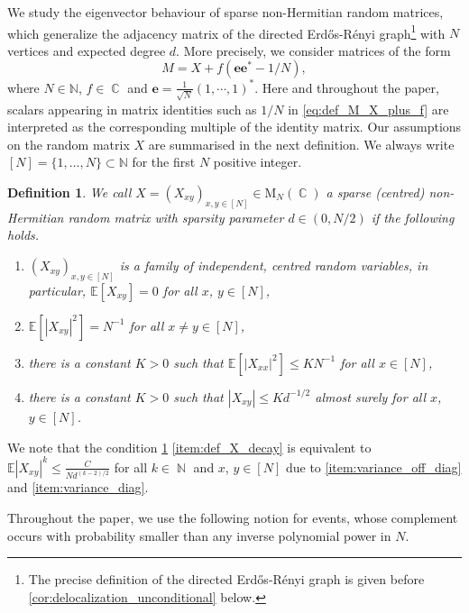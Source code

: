 \documentclass[10pt,a4paper]{amsart}
\DeclareMathOperator{\CC}{\mathbb{C}}
\DeclareMathOperator{\NN}{\mathbb{N}}
\newcommand{\abs}[1]{\left| #1 \right|}
\newcommand{\N}{\mathbb{N}}
\newcommand{\E}{\mathbb{E}}
\newtheorem{defi}{Definition}[section]
\numberwithin{equation}{section}
\begin{document}
	We study the eigenvector behaviour of sparse non-Hermitian random matrices, which generalize 
	the adjacency matrix of the directed Erd\H{o}s-R{\'e}nyi graph\footnote{The precise definition of the directed Erd\H{o}s-R{\'e}nyi graph is given before \cref{cor:delocalization_unconditional} below.} with $N$ vertices and expected degree $d$.  More precisely, we consider matrices of the form 
	\begin{equation}\label{eq:def_M_X_plus_f}
		M= X + f (\mathbf{e}\mathbf{e}^{\ast} - 1/N), 
	\end{equation}
	where $N \in \N$, $ f\in \CC $ and $\mathbf{e} = \frac{1}{\sqrt{N}}(1,\cdots, 1)^{\ast}$. 
	Here and throughout the paper, scalars appearing in matrix identities such as $1/N$ in \cref{eq:def_M_X_plus_f} are interpreted as the corresponding multiple of the identity matrix. 
	Our assumptions on the random matrix $X$ are summarised in the next definition. 
	We always write $[N] = \{ 1, \ldots, N\}\subset \N $ for the first $N$ positive integer. 
	\begin{defi}\label{defiX}
		We call $X = (X_{xy})_{x, y \in [N]} \in \mathrm{M}_N(\CC)$ a \emph{sparse (centred) non-Hermitian random matrix} 
		with sparsity parameter $d \in (0,N/2)$ if the following holds. 
		\begin{enumerate}[label=(\alph*)]
			\item $(X_{xy})_{x, y \in [N]}$ is a family of independent, centred random variables, in particular, $\mathbb{E}[X_{xy}]= 0$ for all $x$, $y \in [N]$,
			\item  \label{item:variance_off_diag} $\E[\abs{X_{xy}}^2] = N^{-1}$ for all $x \neq y \in [N]$,
			\item  \label{item:variance_diag} 
			 there is a constant $K>0$ such that  $\E[\abs{X_{xx}}^2] \leq K N^{-1}$ for all $x \in [N]$, 
			\item \label{item:def_X_decay} 
			there is a constant $K>0$ such that $\abs{X_{xy}} \leq Kd^{-1/2}$ almost surely for all $x$, $y \in [N]$.
		\end{enumerate}
	\end{defi}
	
	 We note that the condition \cref{defiX} \cref{item:def_X_decay} is equivalent to $\E \abs{X_{xy}}^k \leq \frac{C}{Nd^{(k-2)/2}}$ for all $k\in \NN$ and $x$, $y \in [N]$ due to \cref{item:variance_off_diag} and \cref{item:variance_diag}.
	

	
	
	Throughout the paper, we use the following notion for events, whose complement occurs with probability smaller than any inverse polynomial power in $N$. 
	
\end{document}
